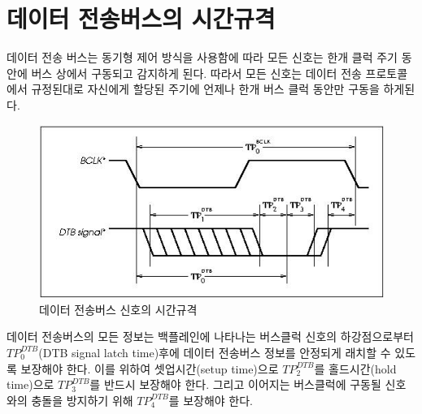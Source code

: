 \section{데이터 전송버스의 시간규격}
데이터 전송 버스는 동기형 제어 방식을 사용함에 따라 모든 신호는 한개 클럭 주기 동안에 버스 상에서
구동되고 감지하게 된다. 따라서 모든 신호는 데이터 전송 프로토콜에서 규정된대로
자신에게 할당된 주기에 언제나 한개 버스 클럭 동안만 구동을 하게된다.
%

\begin{figure}[htb]
    \centerline{\includegraphics{ch6/FIG/dtb-time.jpg}}
   \caption{데이터 전송버스 신호의 시간규격}\label{figure:dtb-time}
\end{figure}
%

데이터 전송버스의 모든 정보는 백플레인에 나타나는 버스클럭 신호의 하강점으로부터
$TP^{DTB}_0$(DTB signal latch time)후에
데이터 전송버스 정보를 안정되게 래치할 수 있도록 보장해야 한다.
이를 위하여 셋업시간(setup time)으로 $TP^{DTB}_2$를
홀드시간(hold time)으로 $TP^{DTB}_3$를 반드시 보장해야 한다.
그리고 이어지는 버스클럭에 구동될 신호와의 충돌을 방지하기 위해
$TP^{DTB}_4$를 보장해야 한다.
%
